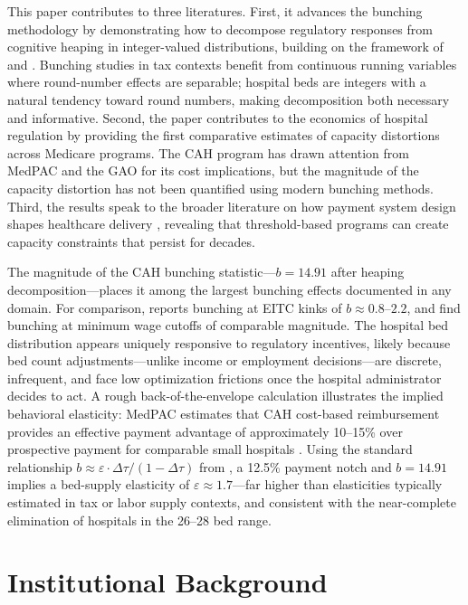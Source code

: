 \documentclass[12pt]{article}
\begin{document}
This paper contributes to three literatures. First, it advances the bunching methodology by demonstrating how to decompose regulatory responses from cognitive heaping in integer-valued distributions, building on the framework of \citet{Kleven2016} and \citet{KlevenWaseem2013}. Bunching studies in tax contexts benefit from continuous running variables where round-number effects are separable; hospital beds are integers with a natural tendency toward round numbers, making decomposition both necessary and informative. Second, the paper contributes to the economics of hospital regulation by providing the first comparative estimates of capacity distortions across Medicare programs. The CAH program has drawn attention from MedPAC \citep{MedPAC2023, MedPAC2021} and the GAO \citep{GAO2018} for its cost implications, but the magnitude of the capacity distortion has not been quantified using modern bunching methods. Third, the results speak to the broader literature on how payment system design shapes healthcare delivery \citep{CooperCraigGaynor2019, Gowrisankaran2015, Chandra2012}, revealing that threshold-based programs can create capacity constraints that persist for decades.

The magnitude of the CAH bunching statistic---$b = 14.91$ after heaping decomposition---places it among the largest bunching effects documented in any domain. For comparison, \citet{Saez2010} reports bunching at EITC kinks of $b \approx 0.8$--$2.2$, and \citet{CengizDube2019} find bunching at minimum wage cutoffs of comparable magnitude. The hospital bed distribution appears uniquely responsive to regulatory incentives, likely because bed count adjustments---unlike income or employment decisions---are discrete, infrequent, and face low optimization frictions once the hospital administrator decides to act. A rough back-of-the-envelope calculation illustrates the implied behavioral elasticity: MedPAC estimates that CAH cost-based reimbursement provides an effective payment advantage of approximately 10--15\% over prospective payment for comparable small hospitals \citep{MedPAC2021}. Using the standard relationship $b \approx \varepsilon \cdot \Delta \tau / (1 - \Delta \tau)$ from \citet{KlevenWaseem2013}, a 12.5\% payment notch and $b = 14.91$ implies a bed-supply elasticity of $\varepsilon \approx 1.7$---far higher than elasticities typically estimated in tax or labor supply contexts, and consistent with the near-complete elimination of hospitals in the 26--28 bed range.

\section{Institutional Background}
\end{document}
